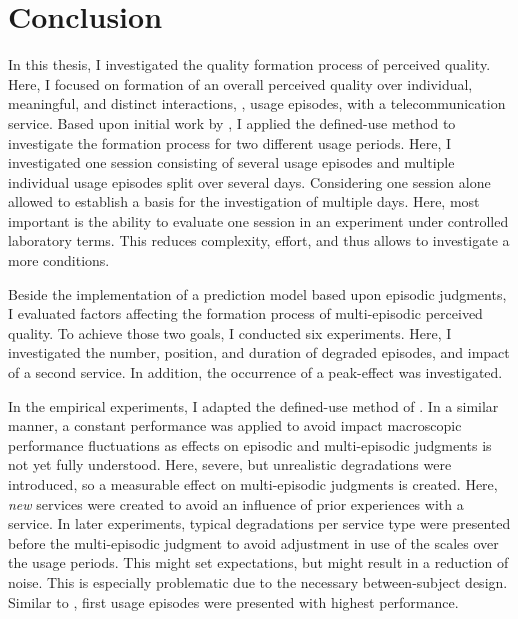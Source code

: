 \chapter{Conclusion}\label{chap:discussion}

In this thesis, I investigated the quality formation process of perceived quality.
Here, I focused on formation of an overall perceived quality over individual, meaningful, and distinct interactions, \ie, usage episodes, with a telecommunication service.
Based upon initial work by \citet{moller_single-call_2011}, I applied the defined-use method to investigate the formation process for two different usage periods.
Here, I investigated one session consisting of several usage episodes and multiple individual usage episodes split over several days.
Considering one session alone allowed to establish a basis for the investigation of multiple days.
Here, most important is the ability to evaluate one session in an experiment under controlled laboratory terms.
This reduces complexity, effort, and thus allows to investigate a more conditions.

Beside the implementation of a prediction model based upon episodic judgments, I evaluated factors affecting the formation process of multi-episodic perceived quality.
To achieve those two goals, I conducted six experiments.
Here, I investigated the number, position, and duration of degraded episodes, and impact of a second service.
In addition, the occurrence of a peak-effect was investigated.

In the empirical experiments, I adapted the defined-use method of \cite{moller_single-call_2011}.
In a similar manner, a constant performance was applied to avoid impact macroscopic performance fluctuations as effects on episodic and multi-episodic judgments is not yet fully understood.
Here, severe, but unrealistic degradations were introduced, so a measurable effect on multi-episodic judgments is created.
Here, \emph{new} services were created to avoid an influence of prior experiences with a service.
In later experiments, typical degradations per service type were presented before the multi-episodic judgment to avoid adjustment in use of the scales over the usage periods.
This might set expectations, but might result in a reduction of noise.
This is especially problematic due to the necessary between-subject design.
Similar to \cite{moller_single-call_2011}, first usage episodes were presented with highest performance.

